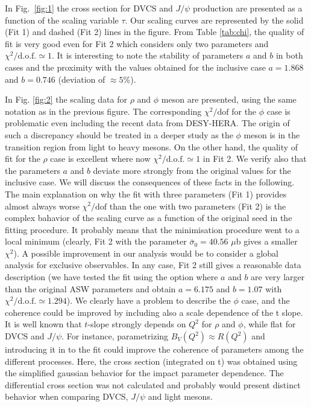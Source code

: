 \documentclass[twocolumn,showpacs,preprintnumbers,amsmath,amssymb,showkeys,aps,prd,a4paper,byrevtex]{revtex4}
\begin{document}
In Fig.~\ref{fig:1} the cross section for DVCS and $J/\psi$ production are presented as a function of the scaling variable $\tau$.   Our scaling curves are represented by the solid (Fit 1) and dashed (Fit 2) lines in the figure. From Table \ref{tab:chi}, the quality of fit is very good even for Fit 2 which considers only two parameters and $\chi^2/\mathrm{d.o.f.}\simeq 1$. It is interesting to note the stability of parameters $a$ and $b$ in both cases and the proximity with the values obtained for the inclusive case $a=1.868$ and $b=0.746$  \cite{Armesto_scal} (deviation of $\approx 5 $\%). 

In Fig. \ref{fig:2} the scaling data for $\rho$ \cite{rho} and $\phi$ \cite{phi} meson are presented, using the same notation as in the previous figure.  The corresponding $\chi^2/\mathrm{dof}$ for the $\phi$ case is problematic even including the recent data from DESY-HERA. The origin of such a discrepancy should be treated in a deeper study as the $\phi$ meson is in the transition region from light to heavy mesons. On the other hand, the quality of fit for the $\rho$  case is excellent where now $\chi^2/\mathrm{d.o.f.}\simeq 1$ in Fit 2. We verify also that the parameters $a$ and $b$ deviate more strongly from the original values for the inclusive case. We will discuss the consequences of these facts in the following. The main explanation on why the  fit with three parameters
(Fit 1) provides almost always worse $\chi^2/\mathrm{dof}$ than the one with two parameters (Fit 2) is the complex bahavior of the scaling curve as a function of the original seed in the fitting procedure. It probably means that the minimisation procedure went to a local minimum (clearly, Fit 2 with the parameter $\bar{\sigma}_0=40.56$ $\mu$b gives a smaller $\chi^2$).  A possible improvement in our analysis would be to consider a global analysis for exclusive observables. In any case, Fit 2 still gives a reasonable data description (we have tested the fit using the option where $a$ and $b$ are very larger than the original ASW parameters and obtain $a=6.175$ and $b=1.07$ with $\chi^2/\mathrm{d.o.f.}\simeq 1.294$). We clearly have a problem to describe the $\phi$ case, and the coherence could be improved by including also a scale dependence of the t slope. It is well known that $t$-slope strongly depends on $Q^2$ for $\rho$ and $\phi$, while flat for DVCS and $J/\psi$. For instance, parametrizing $B_V(Q^2)\approx R(Q^2)$ and introducing it in to the fit could improve the coherence of parameters among the different processes. Here, the cross section (integrated on t) was obtained using the simplified gaussian behavior for the impact parameter dependence. The differential cross section was not calculated and probably would present distinct behavior when comparing DVCS, $J/\psi$  and light mesons.
\end{document}
